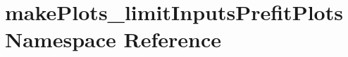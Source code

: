 \hypertarget{namespacemakePlots__limitInputsPrefitPlots}{
\section{makePlots\_\-limitInputsPrefitPlots Namespace Reference}
\label{namespacemakePlots__limitInputsPrefitPlots}
}
